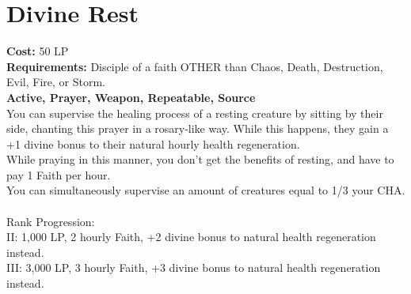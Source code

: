 \section{Divine Rest}\label{prayer:divineRest}
\textbf{Cost:} 50 LP\\
\textbf{Requirements:} Disciple of a faith OTHER than Chaos, Death, Destruction, Evil, Fire, or Storm.\\
\textbf{Active, Prayer, Weapon, Repeatable, Source}\\
You can supervise the healing process of a resting creature by sitting by their side, chanting this prayer in a rosary-like way.
While this happens, they gain a +1 divine bonus to their natural hourly health regeneration.\\
While praying in this manner, you don't get the benefits of resting, and have to pay 1 Faith per hour.\\
You can simultaneously supervise an amount of creatures equal to 1/3 your CHA.\\
\\
Rank Progression:\\
II: 1,000 LP, 2 hourly Faith, +2 divine bonus to natural health regeneration instead.\\
III: 3,000 LP, 3 hourly Faith, +3 divine bonus to natural health regeneration instead.\\